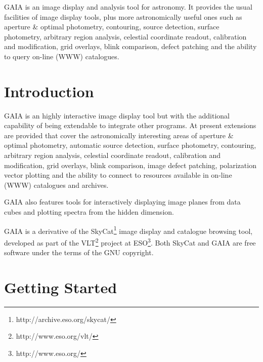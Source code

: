 \documentclass[twoside,11pt]{article}
\newcommand{\stardocinitials}  {SUN}
\newcommand{\stardocnumber}    {214.19}
\newcommand{\stardocabstract} {GAIA is an image display and analysis
tool for astronomy. It provides the usual facilities of image display
tools, plus more astronomically useful ones such as aperture \& optimal
photometry, contouring, source detection, surface photometry,
arbitrary region analysis, celestial coordinate readout, calibration
and modification, grid overlays, blink comparison, defect patching and
the ability to query on-line (WWW) catalogues.}
\newcommand{\stardocname}{\stardocinitials /\stardocnumber}
\newcommand{\htmladdnormallinkfoot}[2]{#1\footnote{#2}}
\newenvironment{latexonly}{}{}
\newcommand{\xlabel}[1]{}
\renewcommand{\_}{\texttt{\symbol{95}}}
\renewcommand{\thepage}{\roman{page}}
\begin{document}
\stardocabstract
  \newpage
  \begin{latexonly}
    \setlength{\parskip}{0mm}
    \tableofcontents
    \setlength{\parskip}{\medskipamount}
    \markboth{\stardocname}{\stardocname}
  \end{latexonly}
\cleardoublepage
\renewcommand{\thepage}{\arabic{page}}
\setcounter{page}{1}


\section{Introduction\xlabel{introduction}\label{introduction}}

GAIA is an highly interactive image display tool but with the additional
capability of being extendable to integrate other programs.  At present
extensions are provided that cover the astronomically interesting areas of
aperture \& optimal photometry, automatic source detection, surface
photometry, contouring, arbitrary region analysis, celestial coordinate
readout, calibration and modification, grid overlays, blink comparison, image
defect patching, polarization vector plotting and the ability to connect to
resources available in on-line (WWW) catalogues and archives.

GAIA also features tools for interactively displaying image planes from data
cubes and plotting spectra from the hidden dimension.

GAIA is a derivative of the
\htmladdnormallinkfoot{SkyCat}{http://archive.eso.org/skycat/} image
display and catalogue browsing tool, developed as part of the
\htmladdnormallinkfoot{VLT}{http://www.eso.org/vlt/} project at
\htmladdnormallinkfoot{ESO}{http://www.eso.org/}. Both SkyCat and GAIA are
free software under the terms of the GNU copyright.

\section{\xlabel{getting_started}Getting Started}
\end{document}
